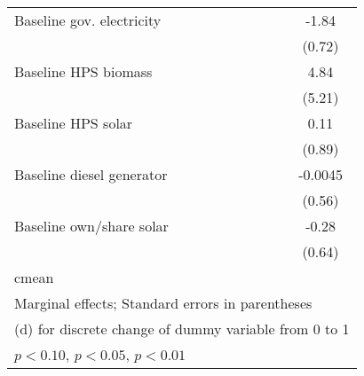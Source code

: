 \begin{table}[htbp]
\begin{tabular*}{1\hsize}{@{\hskip\tabcolsep\extracolsep\fill}l*{5}{c}}
Baseline gov. electricity&                  &                  &                  &                  &    -1.84\sym{**} \\
                &                  &                  &                  &                  &   (0.72)         \\
Baseline HPS biomass&                  &                  &                  &                  &     4.84         \\
                &                  &                  &                  &                  &   (5.21)         \\
Baseline HPS solar&                  &                  &                  &                  &     0.11         \\
                &                  &                  &                  &                  &   (0.89)         \\
Baseline diesel generator&                  &                  &                  &                  &  -0.0045         \\
                &                  &                  &                  &                  &   (0.56)         \\
Baseline own/share solar&                  &                  &                  &                  &    -0.28         \\
                &                  &                  &                  &                  &   (0.64)         \\
\midrule
cmean           &                  &                  &                  &                  &                  \\
\bottomrule
\multicolumn{6}{l}{\footnotesize Marginal effects; Standard errors in parentheses}\\
\multicolumn{6}{l}{\footnotesize  (d) for discrete change of dummy variable from 0 to 1}\\
\multicolumn{6}{l}{\footnotesize \sym{*} \(p<0.10\), \sym{**} \(p<0.05\), \sym{***} \(p<0.01\)}\\
\end{tabular*}
\end{table}
